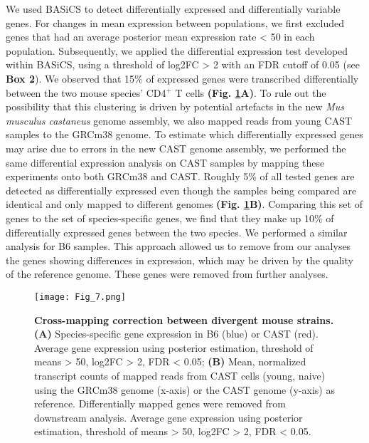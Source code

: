 We used BASiCS to detect differentially expressed and differentially variable genes. For changes in mean expression between populations, we first excluded genes that had an average posterior mean expression rate < 50 in each population. Subsequently, we applied the differential expression test developed within BASiCS, using a threshold of log2FC > 2 with an FDR cutoff of 0.05 (see \textbf{Box 2}). We observed that 15\% of expressed genes were transcribed differentially between the two mouse species’ CD4$^+$ T cells \textbf{(Fig. \ref{fig1:spec_spec_mapping}A)}. To rule out the possibility that this clustering is driven by potential artefacts in the new \textit{Mus musculus castaneus} genome assembly, we also mapped reads from young CAST samples to the GRCm38 genome. To estimate which differentially expressed genes may arise due to errors in the new CAST genome assembly, we performed the same differential expression analysis on CAST samples by mapping these experiments onto both GRCm38 and CAST. Roughly 5\% of all tested genes are detected as differentially expressed even though the samples being compared are identical and only mapped to different genomes \textbf{(Fig. \ref{fig1:spec_spec_mapping}B)}. Comparing this set of genes to the set of species-specific genes, we find that they make up 10\% of differentially expressed genes between the two species. We performed a similar analysis for B6 samples. This approach allowed us to remove from our analyses the genes showing differences in expression, which may be driven by the quality of the reference genome. These genes were removed from further analyses.

\begin{figure}[!hb]
\centering
\texttt{[image: Fig\_7.png]}
\caption[Cross-mapping correction between divergent mouse strains]{\textbf{Cross-mapping correction between divergent mouse strains.}\\
\textbf{(A)} Species-specific gene expression in B6 (blue) or CAST (red). Average gene expression using posterior estimation, threshold of means > 50, log2FC > 2, FDR < 0.05; \textbf{(B)} Mean, normalized transcript counts of mapped reads from CAST cells (young, naive) using the GRCm38 genome (x-axis) or the CAST genome (y-axis) as reference. Differentially mapped genes were removed from downstream analysis. Average gene expression using posterior estimation, threshold of means > 50, log2FC > 2, FDR < 0.05.
}
\label{fig1:spec_spec_mapping}
\end{figure}

